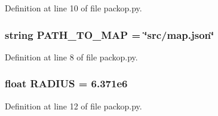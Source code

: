 Definition at line 10 of file packop.\+py.

\subsubsection[{\texorpdfstring{P\+A\+T\+H\+\_\+\+T\+O\+\_\+\+M\+AP}{PATH_TO_MAP}}]{\setlength{\rightskip}{0pt plus 5cm}string P\+A\+T\+H\+\_\+\+T\+O\+\_\+\+M\+AP = \char`\"{}src/map.\+json\char`\"{}}\hypertarget{namespacesrc_1_1packop_ad0b1434232e2f7419383199084141ac0}{}\label{namespacesrc_1_1packop_ad0b1434232e2f7419383199084141ac0}


Definition at line 8 of file packop.\+py.

\subsubsection[{\texorpdfstring{R\+A\+D\+I\+US}{RADIUS}}]{\setlength{\rightskip}{0pt plus 5cm}float R\+A\+D\+I\+US = 6.\+371e6}\hypertarget{namespacesrc_1_1packop_a107fd7168576042ab02c24c419507f1e}{}\label{namespacesrc_1_1packop_a107fd7168576042ab02c24c419507f1e}


Definition at line 12 of file packop.\+py.

